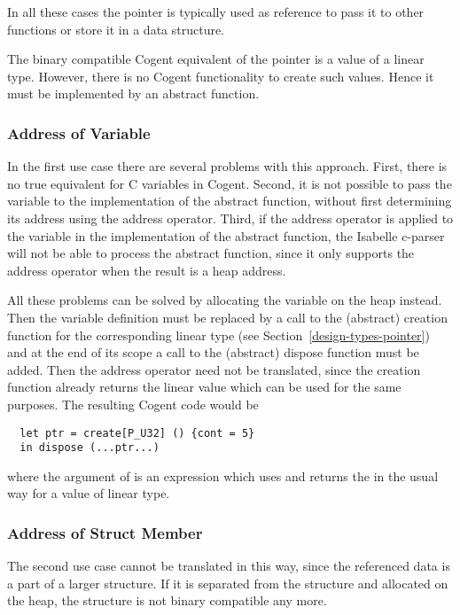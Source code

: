 In all these cases the pointer is typically used as reference to pass it to other functions or store it
in a data structure.

The binary compatible Cogent equivalent of the pointer is a value of a linear type. However, there is
no Cogent functionality to create such values. Hence it must be implemented by an abstract function.

\subsubsection{Address of Variable}

In the first use case there are several problems with this approach. First, there is no true equivalent
for C variables in Cogent. Second, it is not possible to pass the variable to the implementation of the
abstract function, without first determining its address using the address operator. Third, if the address
operator is applied to the variable in the implementation of the abstract function, the Isabelle c-parser
will not be able to process the abstract function, since it only supports the address operator when 
the result is a heap address.

All these problems can be solved by allocating the variable on the heap instead. Then the variable definition
must be replaced by a call to the (abstract) creation function for the corresponding linear type 
(see Section~\ref{design-types-pointer}) and 
at the end of its scope a call to the (abstract) dispose function must be added. Then the address
operator need not be translated, since the creation function already returns the linear value which can be 
used for the same purposes. The resulting Cogent code would be
\begin{verbatim}
  let ptr = create[P_U32] () {cont = 5}
  in dispose (...ptr...)
\end{verbatim}
where the argument of  is an expression which uses and returns the  in the 
usual way for a value of linear type.

\subsubsection{Address of Struct Member}

The second use case cannot be translated in this way, since the referenced data is a part of a larger structure.
If it is separated from the structure and allocated on the heap, the structure is not binary compatible any more.

